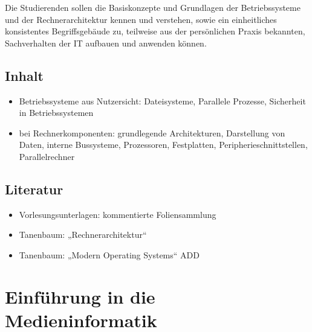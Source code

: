 Die Studierenden sollen die Basiskonzepte und Grundlagen der
Betriebssysteme und der Rechnerarchitektur kennen und verstehen, sowie
ein einheitliches konsistentes Begriffsgebäude zu, teilweise aus der
persönlichen Praxis bekannten, Sachverhalten der IT aufbauen und
anwenden können.

\hypertarget{inhaltpathlabelmi-2017modulbeschreibungen-bachelorba_einfhrunginbetriebssystemeundrechnerarchitektur}{%
\section*{Inhalt\label{/mi-2017/modulbeschreibungen-bachelor/BA_EinfhrunginBetriebssystemeundRechnerarchitektur}}\label{inhaltpathlabelmi-2017modulbeschreibungen-bachelorba_einfhrunginbetriebssystemeundrechnerarchitektur}}

\begin{itemize}
\tightlist
\item
  Betriebssysteme aus Nutzersicht: Dateisysteme, Parallele Prozesse,
  Sicherheit in Betriebssystemen
\item
  bei Rechnerkomponenten: grundlegende Architekturen, Darstellung von
  Daten, interne Bussysteme, Prozessoren, Festplatten,
  Peripherieschnittstellen, Parallelrechner
\end{itemize}

\hypertarget{literaturpathlabelmi-2017modulbeschreibungen-bachelorba_einfhrunginbetriebssystemeundrechnerarchitektur}{%
\section*{Literatur\label{/mi-2017/modulbeschreibungen-bachelor/BA_EinfhrunginBetriebssystemeundRechnerarchitektur}}\label{literaturpathlabelmi-2017modulbeschreibungen-bachelorba_einfhrunginbetriebssystemeundrechnerarchitektur}}

\begin{itemize}
\tightlist
\item
  Vorlesungsunterlagen: kommentierte Foliensammlung
\item
  Tanenbaum: „Rechnerarchitektur``
\item
  Tanenbaum: „Modern Operating Systems`` ADD
\end{itemize}

\hypertarget{einfuxfchrung-in-die-medieninformatikpathlabelmi-2017modulbeschreibungen-bachelorba_einfhrungindiemedieninformatik}{%
\chapter{Einführung in die
Medieninformatik\label{/mi-2017/modulbeschreibungen-bachelor/BA_EinfhrungindieMedieninformatik}}\label{einfuxfchrung-in-die-medieninformatikpathlabelmi-2017modulbeschreibungen-bachelorba_einfhrungindiemedieninformatik}}

